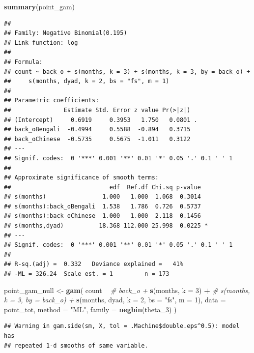 \documentclass[]{article}
\newenvironment{Shaded}{\begin{snugshade}}{\end{snugshade}}
\newcommand{\CommentTok}[1]{\textcolor[rgb]{0.56,0.35,0.01}{\textit{#1}}}
\newcommand{\DataTypeTok}[1]{\textcolor[rgb]{0.13,0.29,0.53}{#1}}
\newcommand{\DecValTok}[1]{\textcolor[rgb]{0.00,0.00,0.81}{#1}}
\newcommand{\KeywordTok}[1]{\textcolor[rgb]{0.13,0.29,0.53}{\textbf{#1}}}
\newcommand{\NormalTok}[1]{#1}
\newcommand{\OperatorTok}[1]{\textcolor[rgb]{0.81,0.36,0.00}{\textbf{#1}}}
\newcommand{\StringTok}[1]{\textcolor[rgb]{0.31,0.60,0.02}{#1}}
\begin{document}
\begin{Shaded}
\begin{Highlighting}[]
\KeywordTok{summary}\NormalTok{(point_gam)}
\end{Highlighting}
\end{Shaded}

\begin{verbatim}
## 
## Family: Negative Binomial(0.195) 
## Link function: log 
## 
## Formula:
## count ~ back_o + s(months, k = 3) + s(months, k = 3, by = back_o) + 
##     s(months, dyad, k = 2, bs = "fs", m = 1)
## 
## Parametric coefficients:
##               Estimate Std. Error z value Pr(>|z|)  
## (Intercept)     0.6919     0.3953   1.750   0.0801 .
## back_oBengali  -0.4994     0.5588  -0.894   0.3715  
## back_oChinese  -0.5735     0.5675  -1.011   0.3122  
## ---
## Signif. codes:  0 '***' 0.001 '**' 0.01 '*' 0.05 '.' 0.1 ' ' 1
## 
## Approximate significance of smooth terms:
##                            edf  Ref.df Chi.sq p-value  
## s(months)                1.000   1.000  1.068  0.3014  
## s(months):back_oBengali  1.538   1.786  0.726  0.5737  
## s(months):back_oChinese  1.000   1.000  2.118  0.1456  
## s(months,dyad)          18.368 112.000 25.998  0.0225 *
## ---
## Signif. codes:  0 '***' 0.001 '**' 0.01 '*' 0.05 '.' 0.1 ' ' 1
## 
## R-sq.(adj) =  0.332   Deviance explained =   41%
## -ML = 326.24  Scale est. = 1         n = 173
\end{verbatim}

\begin{Shaded}
\begin{Highlighting}[]
\NormalTok{point_gam_null <-}\StringTok{ }\KeywordTok{gam}\NormalTok{(}
\NormalTok{  count }\OperatorTok{~}
\StringTok{    }\CommentTok{# back_o +}
\StringTok{    }\KeywordTok{s}\NormalTok{(months, }\DataTypeTok{k =} \DecValTok{3}\NormalTok{) }\OperatorTok{+}
\StringTok{    }\CommentTok{# s(months, k = 3, by = back_o) +}
\StringTok{    }\KeywordTok{s}\NormalTok{(months, dyad, }\DataTypeTok{k =} \DecValTok{2}\NormalTok{, }\DataTypeTok{bs =} \StringTok{"fs"}\NormalTok{, }\DataTypeTok{m =} \DecValTok{1}\NormalTok{),}
  \DataTypeTok{data =}\NormalTok{ point_tot,}
  \DataTypeTok{method =} \StringTok{"ML"}\NormalTok{,}
  \DataTypeTok{family =} \KeywordTok{negbin}\NormalTok{(theta_}\DecValTok{3}\NormalTok{)}
\NormalTok{)}
\end{Highlighting}
\end{Shaded}

\begin{verbatim}
## Warning in gam.side(sm, X, tol = .Machine$double.eps^0.5): model has
## repeated 1-d smooths of same variable.
\end{verbatim}
\end{document}

